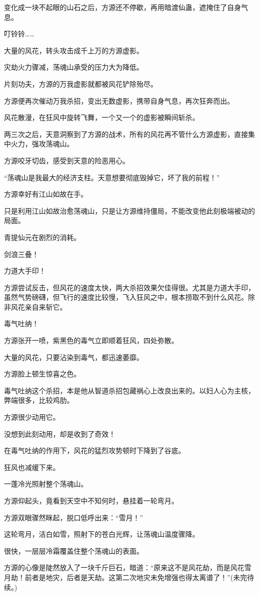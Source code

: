 \begin{this_body}
变化成一块不起眼的山石之后，方源还不停歇，再用暗渡仙蛊，遮掩住了自身气息。

叮铃铃……

大量的风花，转头攻击成千上万的方源虚影。

灾劫火力骤减，荡魂山承受的压力大为降低。

片刻功夫，方源的万我虚影就都被风花铲除殆尽。

方源便再次催动万我杀招，变出无数虚影，携带自身气息，再次狂奔而出。

风花散漫，在狂风中旋转飞舞，一个又一个的虚影被瞬间斩杀。

两三次之后，天意洞察到了方源的战术，所有的风花再不管什么方源虚影，直接集中火力，强攻荡魂山。

方源咬牙切齿，感受到天意的险恶用心。

“荡魂山是我最大的经济支柱。天意想要彻底毁掉它，坏了我的前程！”

方源幸好有江山如故在手。

只是利用江山如故治愈荡魂山，只是让方源维持僵局，不能改变他此刻极端被动的局面。

青提仙元在剧烈的消耗。

剑浪三叠！

力道大手印！

方源尝试反击，但风花的速度太快，两大杀招效果欠佳得很。尤其是力道大手印，虽然气势磅礴，但飞行的速度比较慢，飞入狂风之中，根本捞取不到什么风花。除非风花亲自来斩它。

毒气吐纳！

方源张开一喷，紫黑色的毒气立即顺着狂风，四处弥散。

大量的风花，只要沾染到毒气，都迅速萎靡。

方源脸上顿生惊喜之色。

毒气吐纳这个杀招，本是他从智道杀招包藏祸心上改良出来的。以妇人心为主核，弊端很多，比较鸡肋。

方源很少动用它。

没想到此刻动用，却是收到了奇效！

在毒气吐纳的作用下，风花的猛烈攻势顿时下降到了谷底。

狂风也减缓下来。

一蓬冷光照射整个荡魂山。

方源仰起头，竟看到天空中不知何时，悬挂着一轮弯月。

方源双眼骤然眯起，脱口低呼出来：“雪月！”

这轮弯月，洁白如雪，照射下的苍白光辉，让荡魂山温度骤降。

很快，一层层冷霜覆盖住整个荡魂山的表面。

方源的心像是陡然放入了一块千斤巨石，暗道：“原来这不是风花劫，而是风花雪月劫！前者是地灾，后者是天劫。这第二次地灾未免增强也得太离谱了！”(未完待续。)

\end{this_body}

